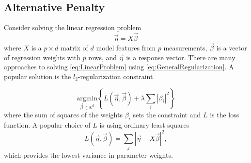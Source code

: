 \subsection{Alternative Penalty}

Consider solving the linear regression problem 
\begin{equation}
\vec{\eta}=X\vec{\beta}\label{eq:LinearProblem}
\end{equation}
where $X$ is a $p\times d$ matrix of $d$ model features from $p$
measurements, $\vec{\beta}$ is a vector of regression weights with
$p$ rows, and $\vec{\eta}$ is a response vector. There are many
approaches to solving \eqref{eq:LinearProblem} using \eqref{eq:GeneralRegularization}.
A popular solution is the $l_{2}$-regularization constraint\cite{springer_series978-0-387-84858-7}

\begin{equation}
\underset{\vec{\beta}\in\mathbb{R}^{d}}{\text{argmin}}\left\{ L\left(\vec{\eta},\vec{\beta}\right)+\lambda\sum_{i}\left|\beta_{i}\right|^{2}\right\} \label{eq:RidgeRegressionGeneral}
\end{equation}
where the sum of squares of the weights $\beta_{i}$ sets the constraint
and $L$ is the loss function. A popular choice of $L$ is using ordinary
least squares 
\[
L\left(\vec{\eta},\vec{\beta}\right)=\sum_{j}\left|\vec{\eta}-X\vec{\beta}\right|^{2},
\]
which provides the lowest variance in parameter weights. 

